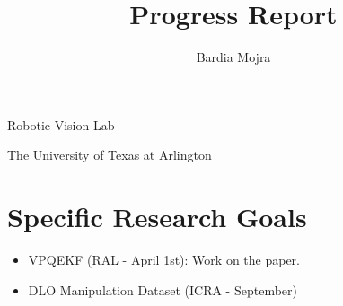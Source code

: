 \documentclass[11pt]{article}
\title{Progress Report}
\author{Bardia Mojra}
\begin{document}
\maketitle
\thispagestyle{empty}

\bigskip
\bigskip
\begin{center}
 Robotic Vision Lab
\end{center}

\begin{center}
The University of Texas at Arlington
\end{center}

\newpage

\section{Specific Research Goals}
\begin{itemize}
      \item VPQEKF (RAL - April 1st): Work on the paper.
      \item DLO Manipulation Dataset (ICRA - September)
\end{itemize}
\end{document}
